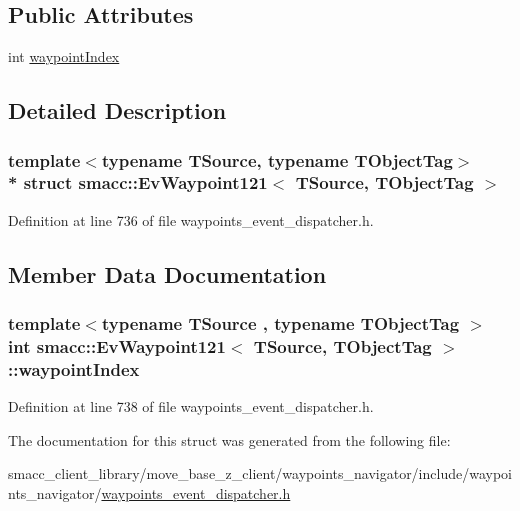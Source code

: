 \subsection*{Public Attributes}
\begin{DoxyCompactItemize}
\item 
int \hyperlink{structsmacc_1_1EvWaypoint121_acf1daeb9ca9e66585ca263700811f70c}{waypoint\+Index}
\end{DoxyCompactItemize}


\subsection{Detailed Description}
\subsubsection*{template$<$typename T\+Source, typename T\+Object\+Tag$>$\\*
struct smacc\+::\+Ev\+Waypoint121$<$ T\+Source, T\+Object\+Tag $>$}



Definition at line 736 of file waypoints\+\_\+event\+\_\+dispatcher.\+h.



\subsection{Member Data Documentation}
\subsubsection[{\texorpdfstring{waypoint\+Index}{waypointIndex}}]{\setlength{\rightskip}{0pt plus 5cm}template$<$typename T\+Source , typename T\+Object\+Tag $>$ int {\bf smacc\+::\+Ev\+Waypoint121}$<$ T\+Source, T\+Object\+Tag $>$\+::waypoint\+Index}\hypertarget{structsmacc_1_1EvWaypoint121_acf1daeb9ca9e66585ca263700811f70c}{}\label{structsmacc_1_1EvWaypoint121_acf1daeb9ca9e66585ca263700811f70c}


Definition at line 738 of file waypoints\+\_\+event\+\_\+dispatcher.\+h.



The documentation for this struct was generated from the following file\+:\begin{DoxyCompactItemize}
\item 
smacc\+\_\+client\+\_\+library/move\+\_\+base\+\_\+z\+\_\+client/waypoints\+\_\+navigator/include/waypoints\+\_\+navigator/\hyperlink{waypoints__event__dispatcher_8h}{waypoints\+\_\+event\+\_\+dispatcher.\+h}\end{DoxyCompactItemize}
